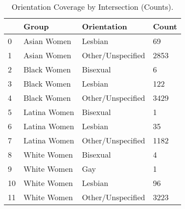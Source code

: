 \begin{table}[htbp]
\centering
\caption{Orientation Coverage by Intersection (Counts).}
\label{tab:eda_orientation_by_group}
\begin{tabular}{llll}
\toprule
 & Group & Orientation & Count \\
\midrule
0 & Asian Women & Lesbian & 69 \\
1 & Asian Women & Other/Unspecified & 2853 \\
2 & Black Women & Bisexual & 6 \\
3 & Black Women & Lesbian & 122 \\
4 & Black Women & Other/Unspecified & 3429 \\
5 & Latina Women & Bisexual & 1 \\
6 & Latina Women & Lesbian & 35 \\
7 & Latina Women & Other/Unspecified & 1182 \\
8 & White Women & Bisexual & 4 \\
9 & White Women & Gay & 1 \\
10 & White Women & Lesbian & 96 \\
11 & White Women & Other/Unspecified & 3223 \\
\bottomrule
\end{tabular}

\end{table}